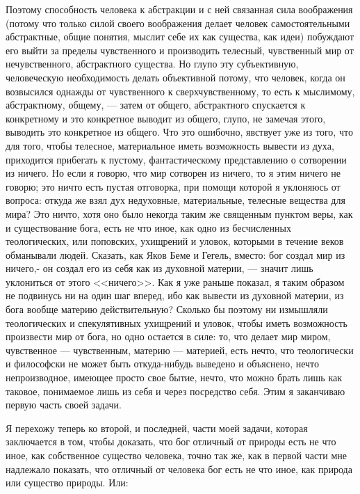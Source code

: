 \documentclass[12pt]{article}
\begin{document}
Поэтому способность человека к абстракции и с ней связанная сила воображения (потому что только силой своего воображения делает человек самостоятельными абстрактные, общие понятия, мыслит себе их как существа, как идеи) побуждают его выйти за пределы чувственного и производить телесный, чувственный мир от нечувственного, абстрактного существа. Но глупо эту субъективную, человеческую необходимость делать объективной потому, что человек, когда он возвысился однажды от чувственного к сверхчувственному, то есть к мыслимому, абстрактному, общему, --- затем от общего, абстрактного спускается к конкретному и это конкретное выводит из общего, глупо, не замечая этого, выводить это конкретное из общего. Что это ошибочно, явствует уже из того, что для того, чтобы телесное, материальное иметь возможность вывести из духа, приходится прибегать к пустому, фантастическому представлению о сотворении из ничего. Но если я говорю, что мир сотворен из ничего, то я этим ничего не говорю; это ничто есть пустая отговорка, при помощи которой я уклоняюсь от вопроса: откуда же взял дух недуховные, материальные, телесные вещества для мира? Это ничто, хотя оно было некогда таким же священным пунктом веры, как и существование бога, есть не что иное, как одно из бесчисленных теологических, или поповских, ухищрений и уловок, которыми в течение веков обманывали людей. Сказать, как Яков Беме и Гегель, вместо: бог создал мир из ничего,- он создал его из себя как из духовной материи, --- значит лишь уклониться от этого <<ничего>>. Как я уже раньше показал, я таким образом не подвинусь ни на один шаг вперед, ибо как вывести из духовной материи, из бога вообще материю действительную? Сколько бы поэтому ни измышляли теологических и спекулятивных ухищрений и уловок, чтобы иметь возможность произвести мир от бога, но одно остается в силе: то, что делает мир миром, чувственное --- чувственным, материю --- материей, есть нечто, что теологически и философски не может быть откуда-нибудь выведено и объяснено, нечто непроизводное, имеющее просто свое бытие, нечто, что можно брать лишь как таковое, понимаемое лишь из себя и через посредство себя. Этим я заканчиваю первую часть своей задачи. 

Я перехожу теперь ко второй, и последней, части моей задачи, которая заключается в том, чтобы доказать, что бог отличный от природы есть не что иное, как собственное существо человека, точно так же, как в первой части мне надлежало показать, что отличный от человека бог есть не что иное, как природа или существо природы. Или: 
\end{document}
